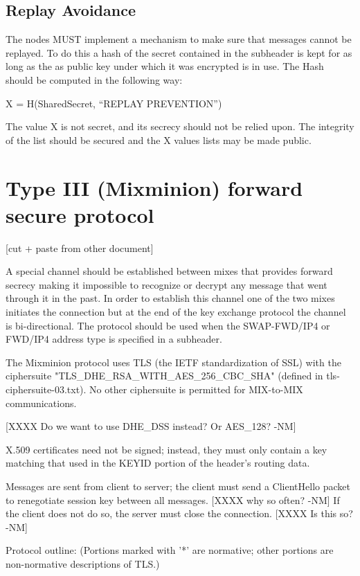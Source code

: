 \subsection{Replay Avoidance}

The nodes MUST implement a mechanism to make sure that messages cannot
be replayed. To do this a hash of the secret contained in the
subheader is kept for as long as the as public key under which it was
encrypted is in use. The Hash should be computed in the following way:

X = H(SharedSecret, ``REPLAY PREVENTION'')

The value X is not secret, and its secrecy should not be relied upon.
The integrity of the list should be secured and the X values lists may
be made public.

\section{Type III (Mixminion) forward secure protocol}

[cut + paste from other document]

A special channel should be established between mixes that provides
forward secrecy making it impossible to recognize or decrypt any
message that went through it in the past. In order to establish this
channel one of the two mixes initiates the connection but at the end
of the key exchange protocol the channel is bi-directional. The
protocol should be used when the SWAP-FWD/IP4 or FWD/IP4 address type
is specified in a subheader.

The Mixminion protocol uses TLS (the IETF standardization of SSL) with
the ciphersuite "TLS_DHE_RSA_WITH_AES_256_CBC_SHA" (defined in
tls-ciphersuite-03.txt).  No other ciphersuite is permitted for
MIX-to-MIX communications.

  [XXXX Do we want to use DHE_DSS instead?  Or AES_128? -NM]

X.509 certificates need not be signed; instead, they must only contain
a key matching that used in the KEYID portion of the header's routing
data.  

Messages are sent from client to server; the client must send a
ClientHello packet to renegotiate session key between all
messages. [XXXX why so often? -NM] If the client does not do so, the
server must close the connection.  [XXXX Is this so? -NM]

Protocol outline: (Portions marked with '*' are normative; other
portions are non-normative descriptions of TLS.)

